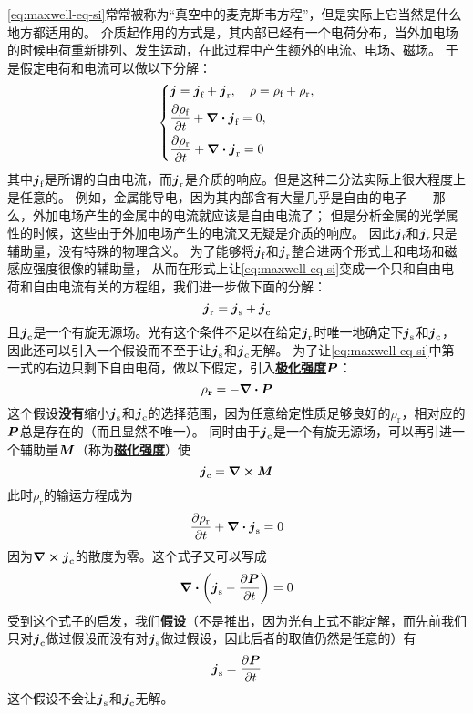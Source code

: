 \documentclass[UTF8, a4paper]{ctexart}
\renewcommand{\emph}[1]{\textbf{#1}}
\newcommand*{\concept}[1]{\underline{\textbf{#1}}}
\begin{document}
\eqref{eq:maxwell-eq-si}常常被称为“真空中的麦克斯韦方程”，但是实际上它当然是什么地方都适用的。
介质起作用的方式是，其内部已经有一个电荷分布，当外加电场的时候电荷重新排列、发生运动，在此过程中产生额外的电流、电场、磁场。
于是假定电荷和电流可以做以下分解：
\[
    \left\{
        \begin{aligned}
            &\vb*{j} = \vb*{j}_\text{f} + \vb*{j}_\text{r}, \quad \rho = \rho_\text{f} + \rho_\text{r}, \\
            &\pdv{\rho_\text{f}}{t} + \div{\vb*{j}_\text{f}} = 0, \\
            &\pdv{\rho_\text{r}}{t} + \div{\vb*{j}_\text{r}} = 0
        \end{aligned}
    \right.
\]
其中$\vb*{j}_\text{f}$是所谓的自由电流，而$\vb*{j}_\text{r}$是介质的响应。但是这种二分法实际上很大程度上是任意的。
例如，金属能导电，因为其内部含有大量几乎是自由的电子——那么，外加电场产生的金属中的电流就应该是自由电流了；
但是分析金属的光学属性的时候，这些由于外加电场产生的电流又无疑是介质的响应。
因此$\vb*{j}_\text{f}$和$\vb*{j}_\text{r}$只是辅助量，没有特殊的物理含义。
为了能够将$\vb*{j}_\text{f}$和$\vb*{j}_\text{r}$整合进两个形式上和电场和磁感应强度很像的辅助量，
从而在形式上让\eqref{eq:maxwell-eq-si}变成一个只和自由电荷和自由电流有关的方程组，我们进一步做下面的分解：
\[
    \vb*{j}_\text{r} = \vb*{j}_\text{s} + \vb*{j}_\text{c}
\]
且$\vb*{j}_\text{c}$是一个有旋无源场。光有这个条件不足以在给定$\vb*{j}_\text{r}$时唯一地确定下$\vb*{j}_\text{s}$和$\vb*{j}_\text{c}$，
因此还可以引入一个假设而不至于让$\vb*{j}_\text{s}$和$\vb*{j}_\text{c}$无解。
为了让\eqref{eq:maxwell-eq-si}中第一式的右边只剩下自由电荷，做以下假定，引入\concept{极化强度}$\vb*{P}$：
\[
    \rho_\textbf{r} = - \div{\vb*{P}}
\]
这个假设\emph{没有}缩小$\vb*{j}_\text{s}$和$\vb*{j}_\text{c}$的选择范围，因为任意给定性质足够良好的$\rho_\text{r}$，相对应的$\vb*{P}$总是存在的（而且显然不唯一）。
同时由于$\vb*{j}_\text{c}$是一个有旋无源场，可以再引进一个辅助量$\vb*{M}$（称为\concept{磁化强度}）使
\[
    \vb*{j}_\text{c} = \curl{\vb*{M}}
\]
此时$\rho_\text{r}$的输运方程成为
\[
    \pdv{\rho_\text{r}}{t} + \div{\vb*{j}_\text{s}} = 0
\]
因为$\curl{\vb*{j}_\text{c}}$的散度为零。这个式子又可以写成
\[
    \div{\left(\vb*{j}_\text{s}-\pdv{\vb*{P}}{t}\right)} = 0
\]
受到这个式子的启发，我们\emph{假设}（不是推出，因为光有上式不能定解，而先前我们只对$\vb*{j}_\text{c}$做过假设而没有对$\vb*{j}_\text{s}$做过假设，因此后者的取值仍然是任意的）有
\[
    \vb*{j}_\text{s} = \pdv{\vb*{P}}{t}
\]
这个假设不会让$\vb*{j}_\text{s}$和$\vb*{j}_\text{c}$无解。
\end{document}
